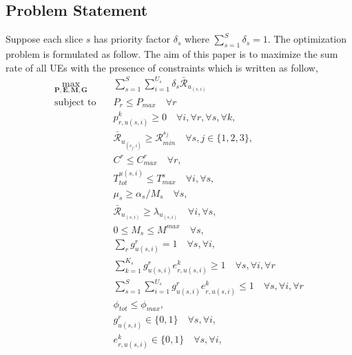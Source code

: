 \documentclass[conference]{IEEEtran}
\begin{document}
\subsection{Problem Statement}
Suppose each slice $s$ has priority factor $\delta_s$ where $\sum_{s=1}^S \delta_s =1$.
The optimization problem is formulated as follow.
The aim of this paper is to maximize the sum rate of all UEs with the presence of constraints which is written as follow,
\begin{subequations}\label{problem}
\begin{alignat}{4}
\max\limits_{\boldsymbol{P}, \boldsymbol{E}, \boldsymbol{M}, \boldsymbol{G} }   \quad &  \sum_{s=1}^{S}\sum_{i=1}^{U_s}\delta_s \bar{\mathcal{R}}_{u_{(s,i)}} \ \\
\text{subject to} \quad  &  P_r \leq P_{max} \quad \forall r
 \label{c11} \\
&p_{r,u(s,i)}^{k}  \geq 0  \quad \forall i,\forall r,\forall s, \forall k,\label{c12} \\
&\bar{\mathcal{R}}_{u_{(s_j,i)}} \geq \mathcal{R}_{min}^{s_j} \quad \forall s, j \in \{1,2,3\}, \label{c13} \\
& C^r \leq C_{max}^r \quad \forall r, \label{c15}\\ 
&T_{tot}^{u(s,i)}  \leq T_{max}^{s} \quad \forall i,\forall s,\label{c16} \\
& \mu_s \geq \alpha_s/M_s \quad \forall s,\label{c16-1} \\
& \bar{\mathcal{R}}_{u_{(s,i)}} \geq {\lambda}_{u_{(s,i)}} \quad \forall i,\forall s,\label{c16-2} \\
& 0 \leq M_s \leq M^{max}  \quad \forall s,\label{c16-3}\\
& \sum_{r}g^r_{u(s,i)} = 1  \quad \forall s,\forall i, \label{c17}  \\
& \sum_{k =1}^{K_s} g^r_{u(s,i)} e^{k}_{r,u(s,i)} \geq 1  \quad \forall s,\forall i ,\forall r \label{c18-1} \\
& \sum_{s =1}^{S}\sum_{i=1}^{U_s}g^r_{u(s,i)} e^{k}_{r,u(s,i)} \leq 1  \quad \forall s,\forall i ,\forall r \label{c18} \\
& \phi_{tot}  \leq \phi_{max}, \label{c19} \\
& g^r_{u(s,i)} \in \{0,1\} \quad \forall s,\forall i, \label{c20}  \\
& e^k_{r,u(s,i)} \in \{0,1\} \quad \forall s,\forall i, \label{c21}  
\end{alignat}
\label{constraints}
\end{subequations}
\end{document}
